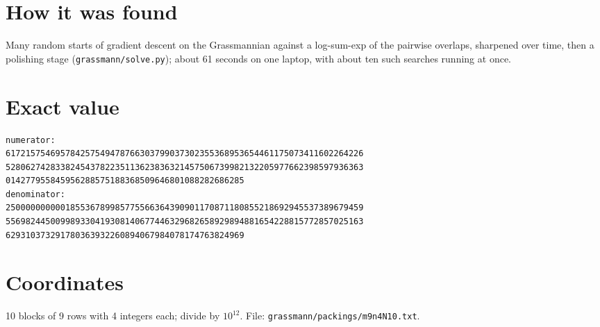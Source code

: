 \documentclass[11pt,a4paper]{article}
\begin{document}
\section{How it was found}
Many random starts of gradient descent on the Grassmannian against a log-sum-exp of the pairwise overlaps, sharpened over time, then a polishing stage (\texttt{grassmann/solve.py}); about 61 seconds on one laptop, with about ten such searches running at once.


\appendix
\section{Exact value}
{\small
\begin{verbatim}
numerator:
617215754695784257549478766303799037302355368953654461175073411602264226
528062742833824543782235113623836321457506739982132205977662398597936363
014277955845956288575188368509646801088282686285
denominator:
250000000000185536789985775566364390901170871180855218692945537389679459
556982445009989330419308140677446329682658929894881654228815772857025163
629310373291780363932260894067984078174763824969
\end{verbatim}}

\section{Coordinates}
10 blocks of 9 rows with 4 integers each; divide by $10^{12}$. File: \texttt{grassmann/packings/m9n4N10.txt}.
{\tiny
\begin{multicols}{3}
\end{multicols}}
\end{document}
